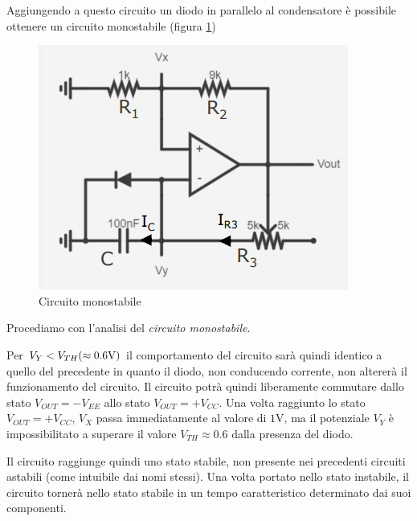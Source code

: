 \documentclass{article}
\begin{document}
\vspace{3mm}

Aggiungendo a questo circuito un diodo in parallelo al condensatore è possibile ottenere un circuito monostabile (figura \ref{Schema_circuito_monostabile})

\clearpage

\begin{figure}[h]
  \centering
  \includegraphics[scale=0.7]{IM_circuito_monostabile}
  \caption{Circuito monostabile}
  \label{Schema_circuito_monostabile}
\end{figure}

Procediamo con l'analisi del \textit{circuito monostabile}.

\vspace{1mm}

Per $V_Y < V_{TH} (\approx 0.6 \textrm V)$ il comportamento del circuito sarà quindi identico a quello del precedente in quanto il diodo, non conducendo corrente, non altererà il funzionamento del circuito. Il circuito potrà quindi liberamente commutare dallo stato $V_{OUT} = - V_{EE}$ allo stato $V_{OUT} = + V_{CC}$. Una volta raggiunto lo stato $V_{OUT} = + V_{CC}$, $V_X$ passa immediatamente al valore di $1$V, ma il potenziale $V_Y$ è impossibilitato a superare il valore $V_{TH} \approx 0.6$ dalla presenza del diodo. 

\vspace{3mm}

Il circuito raggiunge quindi uno stato stabile, non presente nei precedenti circuiti astabili (come intuibile dai nomi stessi). Una volta portato nello stato instabile, il circuito tornerà nello stato stabile in un tempo caratteristico determinato dai suoi componenti. 
\end{document}
